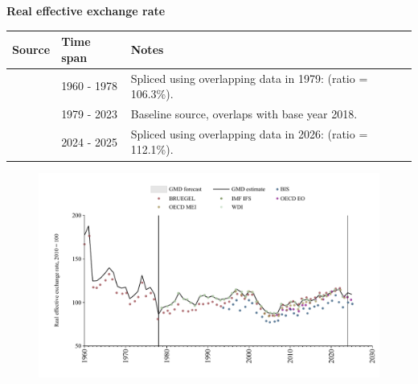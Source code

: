 \documentclass[12pt,a4paper,landscape]{article}
\begin{document}
\begin{adjustbox}{max totalsize={\paperwidth}{\paperheight},center}
\begin{minipage}[t][\textheight][t]{\textwidth}
\vspace*{0.5cm}
{}
\begin{center}
{\Large\bfseries Real effective exchange rate}
\end{center}
\vspace{0.5cm}
\begin{table}[H]
\centering
\small
\begin{tabular}{|l|l|l|}
\hline
\textbf{Source} & \textbf{Time span} & \textbf{Notes} \\
\hline
\rowcolor{white}\cite{BRUEGEL}& 1960 - 1978 &Spliced using overlapping data in 1979: (ratio = 106.3\%). \\
\rowcolor{lightgray}\cite{WDI}& 1979 - 2023 &Baseline source, overlaps with base year 2018. \\
\rowcolor{white}\cite{BIS}& 2024 - 2025 &Spliced using overlapping data in 2026: (ratio = 112.1\%). \\
\hline
\end{tabular}
\end{table}
\begin{figure}[H]
\centering
\includegraphics[width=\textwidth,height=0.6\textheight,keepaspectratio]{graphs/ISR_REER.pdf}
\end{figure}
\end{minipage}
\end{adjustbox}
\end{document}
